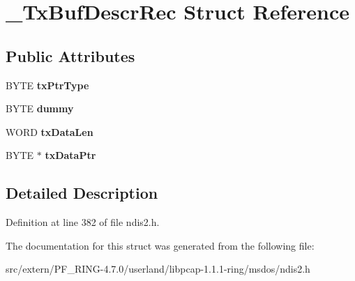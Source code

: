 \hypertarget{struct___tx_buf_descr_rec}{
\section{\_\-TxBufDescrRec Struct Reference}
\label{struct___tx_buf_descr_rec}
}
\subsection*{Public Attributes}
\begin{DoxyCompactItemize}
\item 
\hypertarget{struct___tx_buf_descr_rec_acdea01bbcadbfea510f89edb50a2f573}{
BYTE {\bfseries txPtrType}}
\label{struct___tx_buf_descr_rec_acdea01bbcadbfea510f89edb50a2f573}

\item 
\hypertarget{struct___tx_buf_descr_rec_a82a3927cf9fedcc53581c479027a25cc}{
BYTE {\bfseries dummy}}
\label{struct___tx_buf_descr_rec_a82a3927cf9fedcc53581c479027a25cc}

\item 
\hypertarget{struct___tx_buf_descr_rec_a1afb07d118620f92ad47d9e3ae9a028d}{
WORD {\bfseries txDataLen}}
\label{struct___tx_buf_descr_rec_a1afb07d118620f92ad47d9e3ae9a028d}

\item 
\hypertarget{struct___tx_buf_descr_rec_a3a1caae11f903d88edfd83f4f079fe3f}{
BYTE $\ast$ {\bfseries txDataPtr}}
\label{struct___tx_buf_descr_rec_a3a1caae11f903d88edfd83f4f079fe3f}

\end{DoxyCompactItemize}


\subsection{Detailed Description}


Definition at line 382 of file ndis2.h.



The documentation for this struct was generated from the following file:\begin{DoxyCompactItemize}
\item 
src/extern/PF\_\-RING-\/4.7.0/userland/libpcap-\/1.1.1-\/ring/msdos/ndis2.h\end{DoxyCompactItemize}
